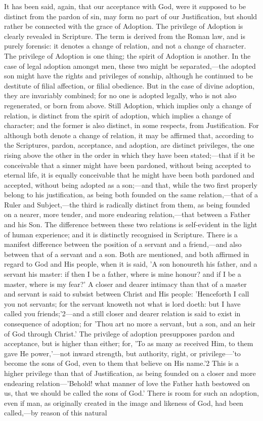 \documentclass[
]{book}
\begin{document}
It has been said, again, that our acceptance with God, were it supposed to be distinct from the pardon of sin, may form no part of our Justification, but should rather be connected with the grace of Adoption. The privilege of Adoption is clearly revealed in Scripture. The term is derived from the Roman law, and is purely forensic: it denotes a change of relation, and not a change of character. The privilege of Adoption is one thing; the spirit of Adoption is another. In the case of legal adoption amongst men, these two might be separated,---the adopted son might have the rights and privileges of sonship, although he continued to be destitute of filial affection, or filial obedience. But in the case of divine adoption, they are invariably combined; for no one is adopted legally, who is not also regenerated, or born from above. Still Adoption, which implies only a change of relation, is distinct from the spirit of adoption, which implies a change of character; and the former is also distinct, in some respects, from Justification. For although both denote a change of relation, it may be affirmed that, according to the Scriptures, pardon, acceptance, and adoption, are distinct privileges, the one rising above the other in the order in which they have been stated;---that if it be conceivable that a sinner might have been pardoned, without being accepted to eternal life, it is equally conceivable that he might have been both pardoned and accepted, without being adopted as a son;---and that, while the two first properly belong to his justification, as being both founded on the same relation,---that of a Ruler and Subject,---the third is radically distinct from them, as being founded on a nearer, more tender, and more endearing relation,---that between a Father and his Son. The difference between these two relations is self-evident in the light of human experience; and it is distinctly recognised in Scripture. There is a manifest difference between the position of a servant and a friend,---and also between that of a servant and a son. Both are mentioned, and both affirmed in regard to God and His people, when it is said, 'A son honoureth his father, and a servant his master: if then I be a father, where is mine honour? and if I be a master, where is my fear?' A closer and dearer intimacy than that of a master and servant is said to subsist between Christ and His people: 'Henceforth I call you not servants; for the servant knoweth not what is lord doeth: but I have called you friends;'2---and a still closer and dearer relation is said to exist in consequence of adoption; for 'Thou art no more a servant, but a son, and an heir of God through Christ.' The privilege of adoption presupposes pardon and acceptance, but is higher than either; for, 'To as many as received Him, to them gave He power,'---not inward strength, but authority, right, or privilege---'to become the sons of God, even to them that believe on His name.'2 This is a higher privilege than that of Justification, as being founded on a closer and more endearing relation---'Behold! what manner of love the Father hath bestowed on us, that we should be called the sons of God.' There is room for such an adoption, even if man, as originally created in the image and likeness of God, had been called,---by reason of this natural 
\end{document}
